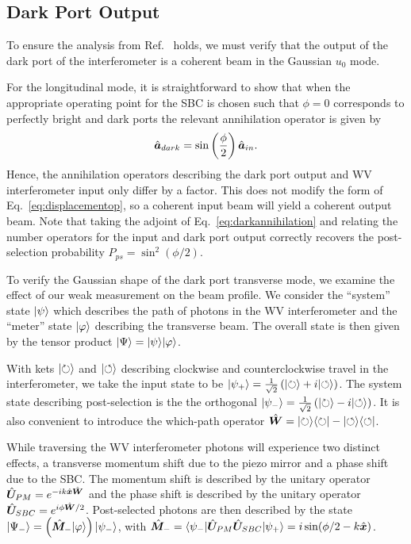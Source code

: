 \subsection{Dark Port Output}

To ensure the analysis from Ref.~\cite{Barnett2003} holds, we must verify that the output of the dark port of the interferometer is a coherent beam in the Gaussian $u_0$ mode.  

For the longitudinal mode, it is straightforward to show that when the appropriate operating point for the SBC is chosen such that $\phi = 0$ corresponds to perfectly bright and dark ports the relevant annihilation operator is given by
\begin{align}\label{eq:darkannihilation}
\hat{\bm a}_{dark} = \sin\left(\frac{\phi}{2}\right)\hat{\bm a}_{in} .  
\end{align}
Hence, the annihilation operators describing the dark port output and WV interferometer input only differ by a factor.  This does not modify the form of Eq.~\eqref{eq:displacementop}, so a coherent input beam will yield a coherent output beam.  Note that taking the adjoint of Eq.~\eqref{eq:darkannihilation} and relating the number operators for the input and dark port output correctly recovers the post-selection probability $P_{ps} = \sin^2 (\phi/2)$.

To verify the Gaussian shape of the dark port transverse mode, we examine the effect of our weak measurement on the beam profile.  We consider the ``system'' state $\lvert \psi\rangle$ which describes the path of photons in the WV interferometer and the ``meter'' state $\lvert \varphi\rangle$ describing the transverse beam.  The overall state is then given by the tensor product $\lvert \Psi\rangle = \lvert \psi\rangle\lvert \varphi\rangle$.

With kets $\lvert \circlearrowright\rangle$ and $\lvert \circlearrowleft\rangle$ describing clockwise and counterclockwise travel in the interferometer, we take the input state to be $\lvert \psi_+\rangle = \frac{1}{\sqrt{2}}\left(\lvert \circlearrowright\rangle + i\lvert \circlearrowleft\rangle\right)$.  The system state describing post-selection is the the orthogonal $\lvert \psi_-\rangle = \frac{1}{\sqrt{2}}\left(\lvert \circlearrowright\rangle - i\lvert \circlearrowleft\rangle\right)$.  It is also convenient to introduce the which-path operator $\hat{\bm W} = \lvert \circlearrowright\rangle\langle \circlearrowright \rvert - \lvert \circlearrowleft\rangle\langle \circlearrowleft \rvert$. 

While traversing the WV interferometer photons will experience two distinct effects, a transverse momentum shift due to the piezo mirror and a phase shift due to the SBC.  The momentum shift is described by the unitary operator $\hat{\bm U}_{PM} = e^{-ik\hat{\bm x}\hat{\bm W}}$ and the phase shift is described by the unitary operator $\hat{\bm U}_{SBC} = e^{i\phi\hat{\bm W}/2}$.  Post-selected photons are then described by the state $\lvert \Psi_{-}\rangle = \left(\hat{\bm M}_{-}\lvert \varphi\rangle\right)\lvert \psi_-\rangle$, with $\hat{\bm M}_- = \langle \psi_- \rvert\hat{\bm U}_{PM}\hat{\bm U}_{SBC}\lvert \psi_+\rangle = i\sin(\phi/2 - k\hat{\bm x})$.

